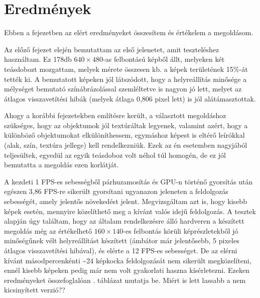 \chapter{Eredmények}

Ebben a fejezetben az elért eredményeket összesítem és értékelem a megoldásom.

Az előző fejezet elején bemutattam az első jelenetet, amit teszteléshez használtam. Ez 178db $640\times 480$-as felbontású képből állt, melyeken két teásdobozt mozgattam, melyek mérete összesen kb. a képek területének 15\%-át tették ki. A bemutatott képeken jól látszódott, hogy a helyreállítás minősége a mélységet bemutató színábrázolással szemléltetve is nagyon jó lett, melyet az átlagos visszavetítési hibák (melyek átlaga 0,806 pixel lett) is jól alátámasztottak.

Ahogy a korábbi fejezetekben említésre került, a választott megoldáshoz szükséges, hogy az objektumok jól textúráltak legyenek, valamint azért, hogy a különböző objektumokat elkülöníthessem, egymáshoz képest is eltérő leírókkal (alak, szín, textúra jellege) kell rendelkezniük. Ezek az én esetemben nagyjából teljesültek, egyedül az egyik teásdoboz volt néhol túl homogén, de ez jól bemutatta a megoldás ezen korlátját.

A kezdeti 1 FPS-es sebességből párhuzamosítás és GPU-n történő gyorsítás után egészen 
3,86 FPS-re sikerült gyorsítani ugyanazon jeleneten a feldolgozás sebességét, amely jelentős növekedést jelent. Megvizsgáltam azt is, hogy kisebb képek esetén, mennyire közelíthető meg a kívánt valós idejű feldolgozás. A tesztek alapján úgy találtam, hogy az általam rendelkezésre álló hardveren a készített megoldás még az értékelhető $160\times 140$-es felbontás körüli képrészletekből jó minőségűnek vélt helyreállítást készített (ámbátor már jelentősebb, 5 pixeles átlagos visszavetítési hibával), és elérte a 12 FPS-es sebességet. De az elérni kívánt másodpercenkénti \textasciitilde 24 képkocka feldolgozását nem sikerült megközelíteni, ennél kisebb képeken pedig már nem volt gyakorlati haszna kísérletezni. Ezeken eredményeket összefoglalóan . táblázat mutatja be. {\color{red} Miért is lett lassabb a nem kicsinyített verzió??}

